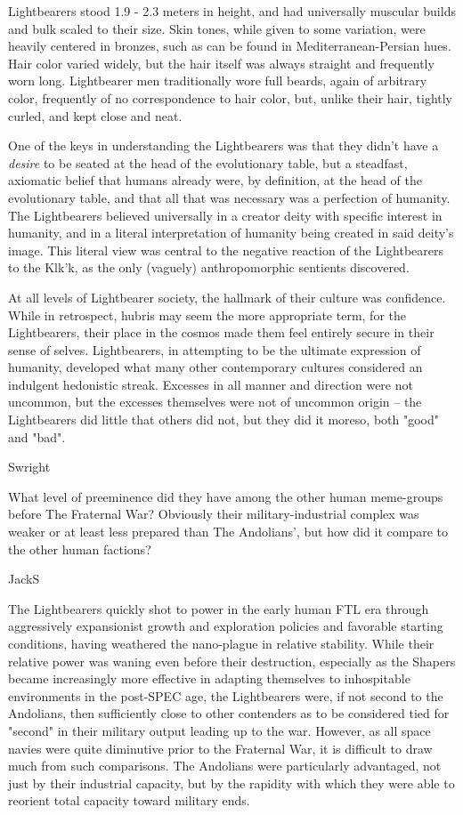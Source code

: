 Lightbearers stood 1.9 - 2.3 meters in height, and had universally
muscular builds and bulk scaled to their size. Skin tones, while given
to some variation, were heavily centered in bronzes, such as can be
found in Mediterranean-Persian hues. Hair color varied widely, but the
hair itself was always straight and frequently worn long. Lightbearer
men traditionally wore full beards, again of arbitrary color,
frequently of no correspondence to hair color, but, unlike their hair,
tightly curled, and kept close and neat.

One of the keys in understanding the Lightbearers was that they didn't
have a {\em desire} to be seated at the head of the evolutionary table,
but a steadfast, axiomatic belief that humans already were, by
definition, at the head of the evolutionary table, and that all that
was necessary was a perfection of humanity. The Lightbearers believed
universally in a creator deity with specific interest in humanity, and
in a literal interpretation of humanity being created in said deity's
image. This literal view was central to the negative reaction of the
Lightbearers to the Klk'k, as the only (vaguely) anthropomorphic
sentients discovered.

At all levels of Lightbearer society, the hallmark of their culture
was confidence. While in retrospect, hubris may seem the more
appropriate term, for the Lightbearers, their place in the cosmos made
them feel entirely secure in their sense of selves. Lightbearers, in
attempting to be the ultimate expression of humanity, developed what
many other contemporary cultures considered an indulgent hedonistic
streak. Excesses in all manner and direction were not uncommon, but
the excesses themselves were not of uncommon origin -- the
Lightbearers did little that others did not, but they did it moreso,
both "good" and "bad".

Swright

What level of preeminence did they have among the other human
meme-groups before The Fraternal War? Obviously their
military-industrial complex was weaker or at least less prepared than
The Andolians', but how did it compare to the other human factions?

JackS

The Lightbearers quickly shot to power in the early human FTL era
through aggressively expansionist growth and exploration policies and
favorable starting conditions, having weathered the nano-plague in
relative stability. While their relative power was waning even before
their destruction, especially as the Shapers became increasingly more
effective in adapting themselves to inhospitable environments in the
post-SPEC age, the Lightbearers were, if not second to the Andolians,
then sufficiently close to other contenders as to be considered tied
for "second" in their military output leading up to the war. However,
as all space navies were quite diminutive prior to the Fraternal War,
it is difficult to draw much from such comparisons. The Andolians were
particularly advantaged, not just by their industrial capacity, but by
the rapidity with which they were able to reorient total capacity
toward military ends.

